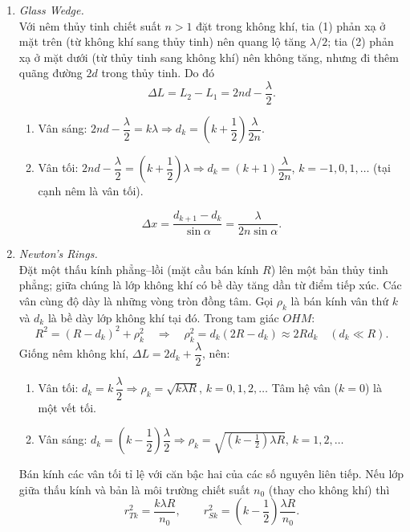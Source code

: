 \begin{enumerate}
\item \textit{Glass Wedge.}\\
Với nêm thủy tinh chiết suất $n > 1$ đặt trong không khí, tia (1) phản xạ ở mặt trên (từ không khí sang thủy tinh) nên quang lộ tăng $\lambda/2$; tia (2) phản xạ ở mặt dưới (từ thủy tinh sang không khí) nên không tăng, nhưng đi thêm quãng đường $2d$ trong thủy tinh. Do đó
\[
\Delta L = L_2 - L_1 = 2nd - \frac{\lambda}{2}.
\]
\begin{enumerate}
  \item[(a)] Vân sáng: $2nd - \dfrac{\lambda}{2} = k\lambda \Rightarrow d_k = \left(k + \dfrac12\right)\dfrac{\lambda}{2n}$.
  \item[(b)] Vân tối: $2nd - \dfrac{\lambda}{2} = \left(k + \dfrac12\right)\lambda \Rightarrow d_k = (k + 1)\dfrac{\lambda}{2n}$, $k = -1, 0, 1, \dots$ (tại cạnh nêm là vân tối).
\end{enumerate}
\[
\Delta x = \frac{d_{k+1} - d_k}{\sin\alpha} = \frac{\lambda}{2n\sin\alpha}.
\]

\item \textit{Newton's Rings.}\\
Đặt một thấu kính phẳng--lồi (mặt cầu bán kính $R$) lên một bản thủy tinh phẳng; giữa chúng là lớp không khí có bề dày tăng dần từ điểm tiếp xúc. Các vân cùng độ dày là những vòng tròn đồng tâm.
Gọi $\rho_k$ là bán kính vân thứ $k$ và $d_k$ là bề dày lớp không khí tại đó. Trong tam giác $OHM$:
\[
R^2 = (R - d_k)^2 + \rho_k^2
\quad\Rightarrow\quad
\rho_k^2 = d_k(2R - d_k) \approx 2Rd_k
\quad (d_k \ll R).
\]
Giống nêm không khí, $\Delta L = 2d_k + \dfrac{\lambda}{2}$, nên:
\begin{enumerate}
  \item[(a)] Vân tối: $d_k = k\,\dfrac{\lambda}{2} \Rightarrow \boxed{\rho_k = \sqrt{k\lambda R}}$, $k = 0, 1, 2, \dots$ Tâm hệ vân ($k = 0$) là một vết tối.
  \item[(b)] Vân sáng: $d_k = \left(k - \dfrac12\right)\dfrac{\lambda}{2} \Rightarrow \boxed{\rho_k = \sqrt{\left(k - \tfrac12\right)\lambda R}}$, $k = 1, 2, \dots$
\end{enumerate}
Bán kính các vân tối tỉ lệ với căn bậc hai của các số nguyên liên tiếp. Nếu lớp giữa thấu kính và bản là môi trường chiết suất $n_0$ (thay cho không khí) thì
\[
r_{Tk}^2 = \frac{k\lambda R}{n_0},
\qquad
r_{Sk}^2 = \left(k - \frac12\right)\frac{\lambda R}{n_0}.
\]
\end{enumerate}

